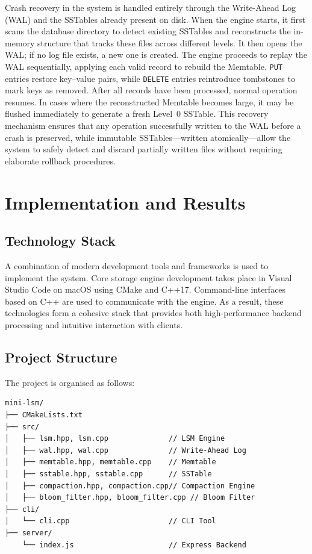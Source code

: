 \documentclass{mnitjaipur}
\begin{document}
Crash recovery in the system is handled entirely through the Write-Ahead Log (WAL) and the SSTables already present on disk. When the engine starts, it first scans the database directory to detect existing SSTables and reconstructs the in-memory structure that tracks these files across different levels. It then opens the WAL; if no log file exists, a new one is created. The engine proceeds to replay the WAL sequentially, applying each valid record to rebuild the Memtable. \texttt{PUT} entries restore key--value pairs, while \texttt{DELETE} entries reintroduce tombstones to mark keys as removed. After all records have been processed, normal operation resumes. In cases where the reconstructed Memtable becomes large, it may be flushed immediately to generate a fresh Level~0 SSTable. This recovery mechanism ensures that any operation successfully written to the WAL before a crash is preserved, while immutable SSTables—written atomically—allow the system to safely detect and discard partially written files without requiring elaborate rollback procedures.

\newpage

\chapter{Implementation and Results}

\section{Technology Stack}

A combination of modern development tools and frameworks is used to implement the system. Core storage engine development takes place in Visual Studio Code on macOS using CMake and C++17. Command-line interfaces based on C++ are used to communicate with the engine. As a result, these technologies form a cohesive stack that provides both high-performance backend processing and intuitive interaction with clients.

\section{Project Structure}
The project is organised as follows:
\begin{verbatim}
mini-lsm/
├── CMakeLists.txt
├── src/
│   ├── lsm.hpp, lsm.cpp              // LSM Engine
│   ├── wal.hpp, wal.cpp              // Write-Ahead Log
│   ├── memtable.hpp, memtable.cpp    // Memtable
│   ├── sstable.hpp, sstable.cpp      // SSTable
│   ├── compaction.hpp, compaction.cpp// Compaction Engine
│   ├── bloom_filter.hpp, bloom_filter.cpp // Bloom Filter
├── cli/
│   └── cli.cpp                       // CLI Tool
├── server/
    └── index.js                      // Express Backend

\end{verbatim}
\end{document}
